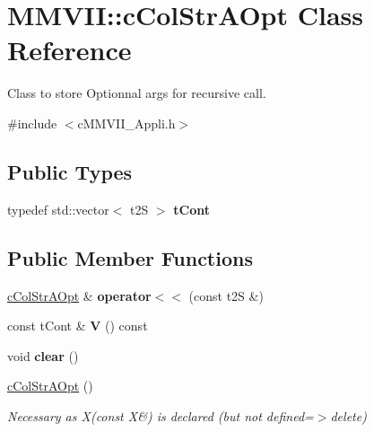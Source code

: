 \hypertarget{classMMVII_1_1cColStrAOpt}{}\section{M\+M\+V\+II\+:\+:c\+Col\+Str\+A\+Opt Class Reference}
\label{classMMVII_1_1cColStrAOpt}


Class to store Optionnal args for recursive call.  




{\ttfamily \#include $<$c\+M\+M\+V\+I\+I\+\_\+\+Appli.\+h$>$}

\subsection*{Public Types}
\begin{DoxyCompactItemize}
\item 
typedef std\+::vector$<$ t2S $>$ {\bfseries t\+Cont}\hypertarget{classMMVII_1_1cColStrAOpt_a098d6611f7351209da1fb1033e5d137c}{}\label{classMMVII_1_1cColStrAOpt_a098d6611f7351209da1fb1033e5d137c}

\end{DoxyCompactItemize}
\subsection*{Public Member Functions}
\begin{DoxyCompactItemize}
\item 
\hyperlink{classMMVII_1_1cColStrAOpt}{c\+Col\+Str\+A\+Opt} \& {\bfseries operator$<$$<$} (const t2S \&)\hypertarget{classMMVII_1_1cColStrAOpt_ad2a0a2f4398a06c1179d6430124175f6}{}\label{classMMVII_1_1cColStrAOpt_ad2a0a2f4398a06c1179d6430124175f6}

\item 
const t\+Cont \& {\bfseries V} () const \hypertarget{classMMVII_1_1cColStrAOpt_a8b948af48b4bf3f7a6f0a1ec6779ebce}{}\label{classMMVII_1_1cColStrAOpt_a8b948af48b4bf3f7a6f0a1ec6779ebce}

\item 
void {\bfseries clear} ()\hypertarget{classMMVII_1_1cColStrAOpt_ae5d339c17e85b270be8b514ddfdf264c}{}\label{classMMVII_1_1cColStrAOpt_ae5d339c17e85b270be8b514ddfdf264c}

\item 
\hyperlink{classMMVII_1_1cColStrAOpt_a41d74a5df3f5af78bf97e1a584f1104e}{c\+Col\+Str\+A\+Opt} ()\hypertarget{classMMVII_1_1cColStrAOpt_a41d74a5df3f5af78bf97e1a584f1104e}{}\label{classMMVII_1_1cColStrAOpt_a41d74a5df3f5af78bf97e1a584f1104e}

\begin{DoxyCompactList}\small\item\em Necessary as X(const X\&) is declared (but not defined=$>$delete) \end{DoxyCompactList}\end{DoxyCompactItemize}
